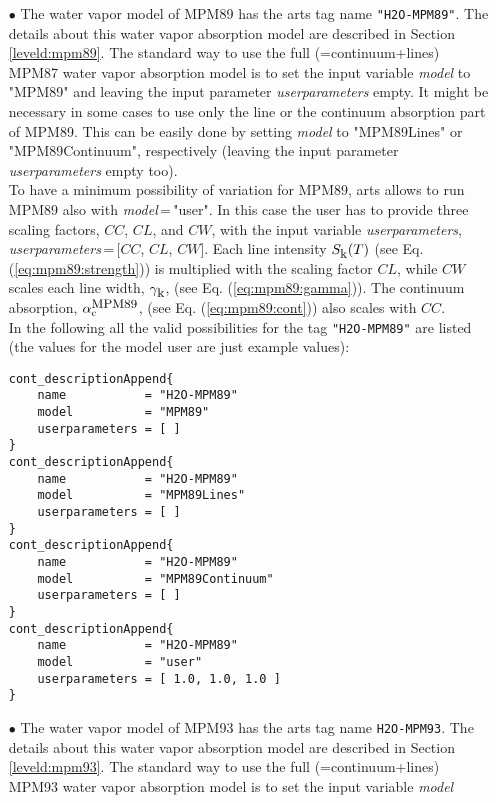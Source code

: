 {\begin{itemize}
\item[$\bullet$] The water vapor model of MPM89 \cite{liebe:89} 
     has the arts tag name {\tt "H2O-MPM89"}. The details about 
     this water vapor absorption model are described in 
     Section \ref{leveld:mpm89}.
     The standard way to use the full (=continuum+lines) MPM87 water 
     vapor absorption model is to set the input variable {\it model} 
     to "MPM89" and leaving the input parameter {\it userparameters} empty. 
     It might be necessary in some cases to use only the line or the 
     continuum absorption part of MPM89. This can be easily done 
     by setting {\it model} to "MPM89Lines" or "MPM89Continuum", 
     respectively (leaving the input parameter {\it userparameters} 
     empty too).\\ To have a minimum possibility of variation for MPM89, 
     arts allows to run MPM89 also with {\it model}\,=\,"user". 
     In this case the user has to provide three scaling factors,  
     $CC$, $CL$, and $CW$, with the input variable {\it userparameters}, 
     {\it userparameters}\,=\,$[$$CC$, $CL$, $CW$$]$. 
     Each line intensity $S_{\mbox{\rm \small k}}(T)$ (see Eq. (\ref{eq:mpm89:strength})) 
     is multiplied with the scaling factor $CL$, while $CW$ scales 
     each line width, $\gamma_{\mbox{\rm \small k}}$, (see Eq. (\ref{eq:mpm89:gamma})). 
     The continuum absorption, $\alpha^{\mbox{\rm \small MPM89}}_{\rm c}$, 
     (see Eq. (\ref{eq:mpm89:cont})) also scales with $CC$.\\
     In the following all the valid possibilities for the
     tag {\tt "H2O-MPM89"} are listed (the values for the 
     model user are just example values): 
\begin{verbatim}
cont_descriptionAppend{
    name           = "H2O-MPM89"
    model          = "MPM89"
    userparameters = [ ]
}
cont_descriptionAppend{
    name           = "H2O-MPM89"
    model          = "MPM89Lines"
    userparameters = [ ]
}
cont_descriptionAppend{
    name           = "H2O-MPM89"
    model          = "MPM89Continuum"
    userparameters = [ ]
}
cont_descriptionAppend{
    name           = "H2O-MPM89"
    model          = "user"
    userparameters = [ 1.0, 1.0, 1.0 ]
}
\end{verbatim}
\item[$\bullet$] The water vapor model of MPM93 \cite{liebeetal:93}
     has the arts tag name {\tt H2O-MPM93}. The details about this water vapor 
     absorption model are described in Section \ref{leveld:mpm93}.
     The standard way to use the full (=continuum+lines) MPM93 water 
     vapor absorption model is to set the input variable {\it model} 

\end{itemize}}
